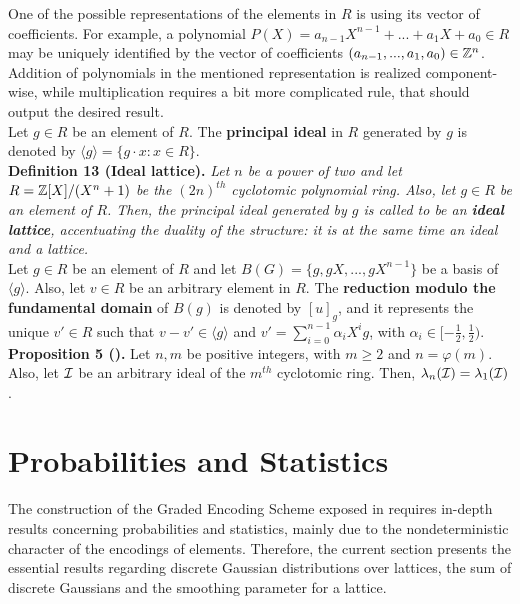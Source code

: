 One of the possible representations of the elements in $R$ is using its vector of coefficients. For example, a polynomial $P(X) = a_{n-1} X ^{n-1} + ... + a_1X + a_0 \in R$ may be uniquely identified by the vector of coefficients $(a_{n-1}, ..., a_1, a_0) \in {\mathbb Z}^n$. Addition of polynomials in the mentioned representation is realized component-wise, while multiplication requires a bit more complicated rule, that should output the desired result. \\

Let $g\in R$ be an element of $R$. The \textbf{principal ideal} in $R$ generated by $g$ is denoted by $\langle g \rangle = \{g\cdot x : x \in R\}$.\\

\textbf{Definition 13 (Ideal lattice).} \textit{Let $n$ be a power of two and let $R = {\mathbb Z}[X]/(X^n + 1)$ be the $(2n)^{th}$ cyclotomic polynomial ring. Also, let $g \in R$ be an element of $R$. Then, the principal ideal generated by $g$ is called to be an \textbf{ideal lattice}, accentuating the duality of the structure: it is at the same time an \textit{ideal} and a \textit{lattice}.}\\

Let $g \in R$ be an element of $R$ and let $B(G) = \{g, gX, ..., gX^{n-1}\}$ be a basis of $\langle g \rangle$. Also, let $v \in R$ be an arbitrary element in $R$. The \textbf{reduction modulo the fundamental domain} of  $B(g)$ is denoted by $[u]_g$, and it represents the unique $v' \in R$ such that $v - v' \in \langle g \rangle$ and $v' = \displaystyle{\sum_{i = 0}^{n-1}} \alpha_iX^ig$, with $\alpha_i \in [-\frac{1}{2}, \frac{1}{2})$.\\

\textbf{Proposition 5 (\cite{LPR12}).} Let $n, m$ be positive integers, with $m\geq 2$ and $n = \varphi(m)$. Also, let $\mathcal{I}$ be an arbitrary ideal of the $m^{th}$ cyclotomic ring. Then, $\lambda_n(\mathcal{I}) = \lambda_1(\mathcal{I})$.

\section{Probabilities and Statistics}

The construction of the Graded Encoding Scheme exposed in \cite{GGH13} requires in-depth results concerning probabilities and statistics, mainly due to the nondeterministic character of the encodings of elements. Therefore, the current section presents the essential results regarding discrete Gaussian distributions over lattices, the sum of discrete Gaussians and the smoothing parameter for a lattice.\\

